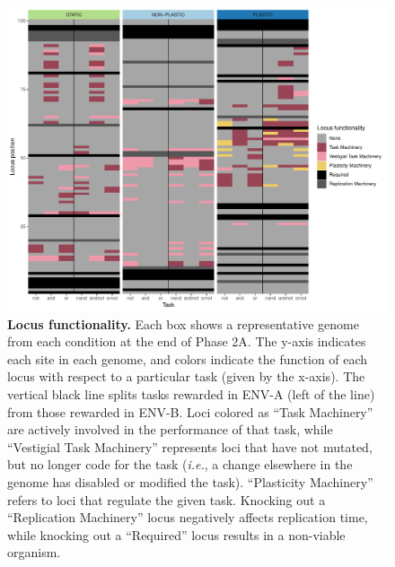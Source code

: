 \begin{figure}[h!]
    \centering
    \includegraphics[width=1\textwidth]{media/architecture/locus_slice_combined_color_facets.pdf}
    \caption{\small
    \textbf{Locus functionality.}
    Each box shows a representative genome from each condition at the end of Phase 2A. 
    The y-axis indicates each site in each genome, and colors indicate the function of each locus with respect to a particular task (given by the x-axis). 
    The vertical black line splits tasks rewarded in ENV-A (left of the line) from those rewarded in ENV-B.
    Loci colored as ``Task Machinery'' are actively involved in the performance of that task, while ``Vestigial Task Machinery'' represents loci that have not mutated, but no longer code for the task (\textit{i.e.}, a change elsewhere in the genome has disabled or modified the task). 
    ``Plasticity Machinery'' refers to loci that regulate the given task. 
    Knocking out a ``Replication Machinery'' locus negatively affects replication time, while knocking out a ``Required'' locus results in a non-viable organism. 
    }
    \label{fig:architecture_locus_functionality}
\end{figure}

